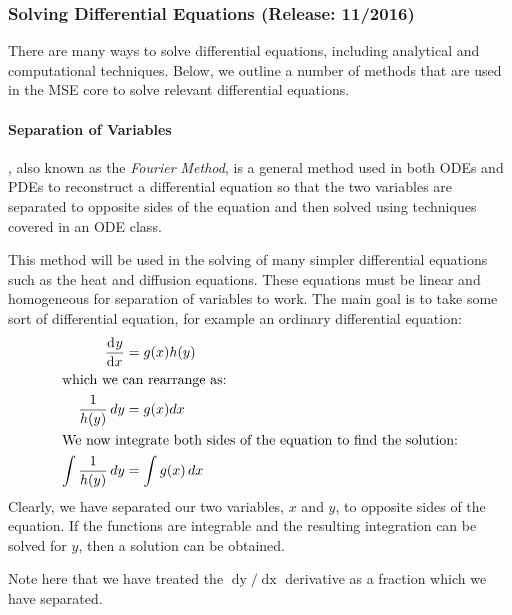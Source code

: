	\subsubsection{Solving Differential Equations  \hfill (Release: 11/2016)}
	There are many ways to solve differential equations, including analytical and computational techniques. Below, we outline a number of methods that are used in the MSE core to solve relevant differential equations.
		\paragraph{Separation of Variables}, also known as the \textit{Fourier Method}, is a general method used in both ODEs and PDEs to reconstruct a differential equation so that the two variables are separated to opposite sides of the equation and then solved using techniques covered in an ODE class. \label{sec:SepVar} 
		
This method will be used in the solving of many simpler differential equations such as the heat and diffusion equations. These equations must be linear and homogeneous for separation of variables to work. The main goal is to take some sort of differential equation, for example an ordinary differential equation:
%
\begin{align}
	\mathop{}\!\frac{\mathrm{d}^{}{y}}{\mathrm{d}{x}^{}} &= g(x)h(y)\\
	\intertext{which we can rearrange as:}
	\frac{1}{h(y)}\mathop{dy} &= g(x)dx\\
	\intertext{We now integrate both sides of the equation to find the solution:} 
	\int{\frac{1}{h(y)}\mathop{dy}} &= \int{g(x)\mathop{dx}}
\end{align}	
%
Clearly, we have separated our two variables, $x$ and $y$, to opposite sides of the equation. If the functions are integrable and the resulting integration can be solved for $y$, then a solution can be obtained.

Note here that we have treated the $\mathop{dy}/\mathop{dx}$ derivative as a fraction which we have separated.  

